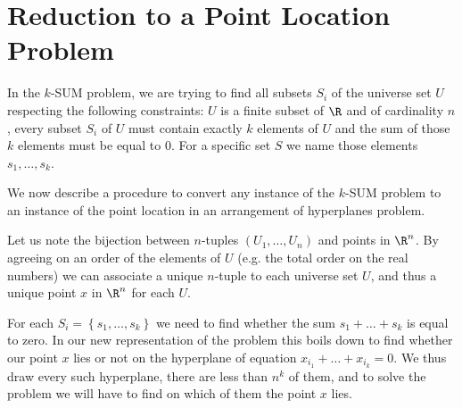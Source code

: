 \section{Reduction to a Point Location Problem}

In the $k$-SUM problem, we are trying to find all subsets $S_i$ of the universe set
$U$ respecting the following constraints: $U$ is a finite subset of $\R$ and of
cardinality $n$, every subset $S_i$ of $U$ must contain exactly
$k$ elements of $U$ and the sum of those $k$ elements must be equal to $0$.
For a specific set $S$ we name those elements $s_1, \dots, s_k$.

We now describe a procedure to convert any instance of the $k$-SUM problem to an
instance of the point location in an arrangement of hyperplanes problem.

Let us note the bijection between $n$-tuples $(U_1, \dots, U_n)$ and points in
$\R^n$. By agreeing on an order of the elements of $U$ (e.g. the total order on
the real numbers) we can associate a unique $n$-tuple to each universe set $U$,
and thus a unique point $x$ in $\R^n$ for each $U$.

For each $S_i = \left\{s_1, \dots, s_k\right\}$ we need to find whether the sum $s_1
+ \dots + s_k$ is equal to zero. In our new representation of the problem this
boils down to find whether our point $x$ lies or not on the hyperplane of
equation $x_{i_1} + \dots + x_{i_k} = 0$. We thus draw every such hyperplane,
there are less than $n^k$ of them, and to solve the problem
we will have to find on which of them the point $x$ lies.
